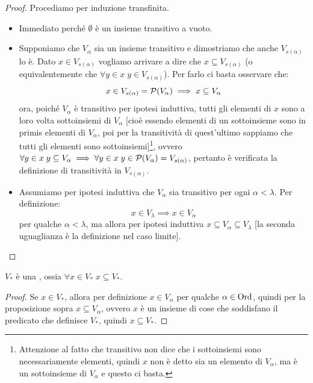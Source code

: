 \begin{proof}
	Procediamo per induzione transfinita.
	\begin{itemize}
		\item[$\boxed{\text{caso $V_0$}}$] Immediato perch\'e $\emptyset$ \`e un insieme transitivo a vuoto.
		\item[$\boxed{\text{caso successore}}$] Supponiamo che $V_\alpha$ sia un insieme transitivo e dimostriamo che
		anche $V_{s(\alpha)}$ lo \`e. Dato $x \in V_{s(\alpha)}$ vogliamo arrivare a dire che $x \subseteq V_{s(\alpha)}$ (o equivalentemente
		che $\forall y \in x \; y \in V_{s(\alpha)}$). Per farlo ci basta osservare che:
		\[ x \in V_{s(\alpha)} = \mathcal{P}(V_\alpha) \implies x \subseteq V_\alpha
			\]
		ora, poich\'e $V_\alpha$ \`e transitivo per ipotesi induttiva, tutti gli elementi di $x$ sono a loro volta sottoinsiemi di $V_\alpha$ [cio\`e essendo elementi di un sottoinsieme sono in primis elementi di $V_\alpha$, poi per la transitivit\`a
		di quest'ultimo sappiamo che tutti gli elementi sono sottoinsiemi]\footnote{Attenzione al fatto che transitivo non dice che i sottoinsiemi sono necessariamente elementi, quindi $x$ non \`e detto sia un elemento di $V_\alpha$, ma \`e un sottoinsieme
		di $V_\alpha$ e questo ci basta.}, ovvero $\forall y \in x \; y \subseteq V_\alpha \implies \forall y \in x \; y \in \mathcal{P}(V_\alpha) = V_{s(\alpha)}$, pertanto \`e verificata la definizione di transitivit\`a in $V_{s(\alpha)}$.
		\item[$\boxed{\text{caso limite}}$] Assumiamo per ipotesi induttiva che $V_\alpha$ sia transitivo per ogni $\alpha < \lambda$. Per definizione:
		\[ x \in V_\lambda \implies x \in V_\alpha
			\]
		per qualche $\alpha < \lambda$, ma allora per ipotesi induttiva $x \subseteq V_\alpha \subseteq V_\lambda$ [la seconda uguaglianza \`e la definizione nel caso limite].
	\end{itemize}
\end{proof}

\begin{corollary}
	$V_*$ \`e una , ossia $\forall x \in V_* \; x \subseteq V_*$.
\end{corollary}

\begin{proof}
	Se $x \in V_*$, allora per definizione $x \in V_\alpha$ per qualche $\alpha \in \operatorname{Ord}$, quindi per la proposizione sopra $x \subseteq V_\alpha$, ovvero $x$ \`e un insieme di cose che soddisfano il predicato che definisce $V_*$, quindi $x \subseteq V_*$.
\end{proof}

